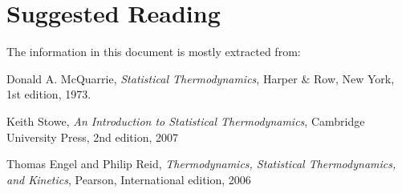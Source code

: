 \documentclass[ignorenonframetext]{beamer}
\begin{document}
\section{Suggested Reading}
The information in this document is mostly extracted from:
\begin{thebibliography}{9}

  Donald A. McQuarrie,
  \textit{Statistical Thermodynamics},
  Harper \& Row, New York,
  1st edition,
  1973.
  
  Keith Stowe,
  \textit{An Introduction to Statistical Thermodynamics},
  Cambridge University Press,
  2nd edition,
  2007
  
 Thomas Engel and Philip Reid,
 \textit{Thermodynamics, Statistical Thermodynamics, and Kinetics},
  Pearson,
  International edition,
  2006
  
\end{thebibliography}
\end{document}
